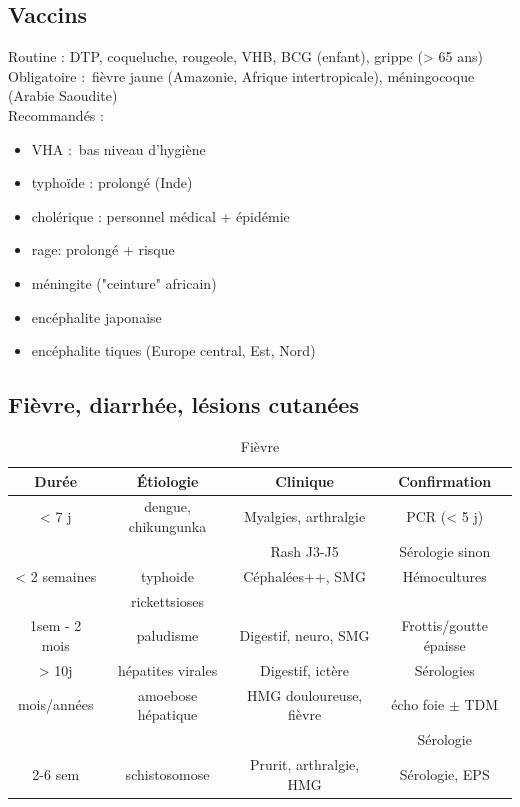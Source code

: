 \subsection{Vaccins}%
Routine : DTP, coqueluche, rougeole, VHB, BCG (enfant), grippe (> 65 ans)\\
Obligatoire : fièvre jaune (Amazonie, Afrique intertropicale), méningocoque
(Arabie Saoudite)\\
Recommandés :
\begin{itemize}
  \item VHA : bas niveau d'hygiène
  \item typhoïde : prolongé (Inde)
  \item cholérique : personnel médical + épidémie
  \item rage: prolongé + risque
  \item méningite ("ceinture" africain)
  \item encéphalite japonaise
  \item encéphalite tiques (Europe central, Est, Nord)
\end{itemize}

\subsection{Fièvre, diarrhée, lésions cutanées}
\begin{table}[htpb]
  \centering
  \caption{Fièvre}
  \begin{tabular}{*{4}{c}}
  \toprule
  Durée        & Étiologie           & Clinique                & Confirmation \\
  \midrule
  < 7 j        & dengue, chikungunka & Myalgies, arthralgie    & PCR (< 5 j)\\
               &                     & Rash J3-J5              & Sérologie sinon\\
  \midrule
  < 2 semaines & typhoide            & Céphalées++, SMG        & Hémocultures\\
               & rickettsioses       & &\\
  \midrule
  1sem - 2 mois& paludisme          & Digestif, neuro, SMG     & Frottis/goutte épaisse\\
  > 10j        & hépatites virales  & Digestif, ictère        & Sérologies \\
  mois/années  & amoebose hépatique & HMG douloureuse, fièvre & écho foie $\pm$ TDM\\
               &                    &                         & Sérologie\\
  2-6 sem      & schistosomose      & Prurit, arthralgie, HMG & Sérologie, EPS\\
  \bottomrule
  \end{tabular}
\end{table}

